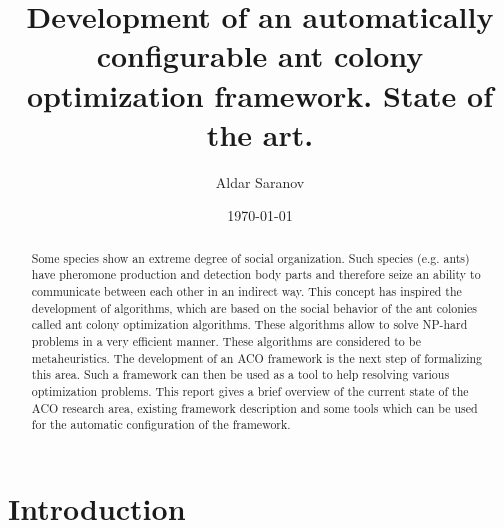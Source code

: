 \documentclass[12pt]{article}
\author{Aldar Saranov}
\date{\today}
\title{Development of an automatically configurable ant colony optimization framework. State of the art.}
\begin{document}
\maketitle 
\newpage

\tableofcontents
\newpage

\begin{abstract}
Some species show an extreme degree of social organization. Such species (e.g. ants) have pheromone production and detection body parts and therefore seize an ability to communicate between each other in an indirect way. This concept has inspired the development of algorithms, which are based on the social behavior of the ant colonies called ant colony optimization algorithms. These algorithms allow to solve NP-hard problems in a very efficient manner. These algorithms are considered to be metaheuristics. The development of an ACO framework is the next step of formalizing this area. Such a framework can then be used as a tool to help resolving various optimization problems. This report gives a brief overview of the current state of the ACO research area, existing framework description and some tools which can be used for the automatic configuration of the framework.
\end{abstract}




\section{Introduction}
\end{document}
